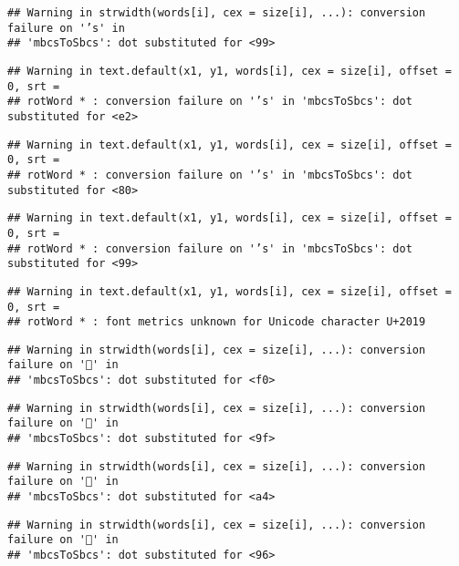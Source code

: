\documentclass[
]{article}
\begin{document}
\begin{verbatim}
## Warning in strwidth(words[i], cex = size[i], ...): conversion failure on '’s' in
## 'mbcsToSbcs': dot substituted for <99>
\end{verbatim}

\begin{verbatim}
## Warning in text.default(x1, y1, words[i], cex = size[i], offset = 0, srt =
## rotWord * : conversion failure on '’s' in 'mbcsToSbcs': dot substituted for <e2>
\end{verbatim}

\begin{verbatim}
## Warning in text.default(x1, y1, words[i], cex = size[i], offset = 0, srt =
## rotWord * : conversion failure on '’s' in 'mbcsToSbcs': dot substituted for <80>
\end{verbatim}

\begin{verbatim}
## Warning in text.default(x1, y1, words[i], cex = size[i], offset = 0, srt =
## rotWord * : conversion failure on '’s' in 'mbcsToSbcs': dot substituted for <99>
\end{verbatim}

\begin{verbatim}
## Warning in text.default(x1, y1, words[i], cex = size[i], offset = 0, srt =
## rotWord * : font metrics unknown for Unicode character U+2019
\end{verbatim}

\begin{verbatim}
## Warning in strwidth(words[i], cex = size[i], ...): conversion failure on '🤖' in
## 'mbcsToSbcs': dot substituted for <f0>
\end{verbatim}

\begin{verbatim}
## Warning in strwidth(words[i], cex = size[i], ...): conversion failure on '🤖' in
## 'mbcsToSbcs': dot substituted for <9f>
\end{verbatim}

\begin{verbatim}
## Warning in strwidth(words[i], cex = size[i], ...): conversion failure on '🤖' in
## 'mbcsToSbcs': dot substituted for <a4>
\end{verbatim}

\begin{verbatim}
## Warning in strwidth(words[i], cex = size[i], ...): conversion failure on '🤖' in
## 'mbcsToSbcs': dot substituted for <96>
\end{verbatim}
\end{document}
